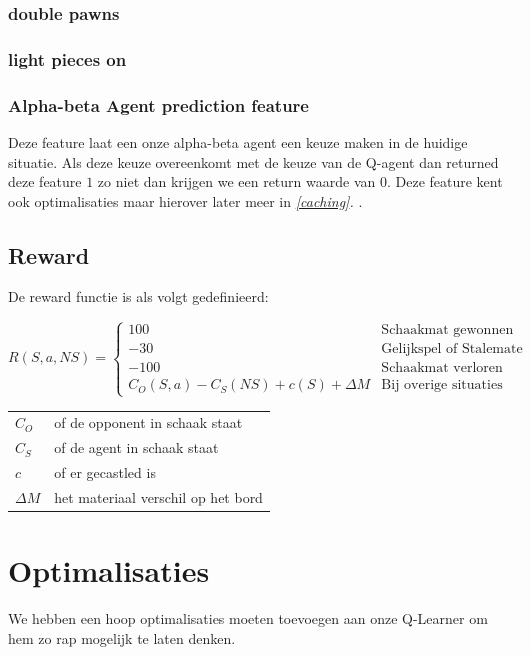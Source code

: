 \documentclass[a4paper,openany]{uantwerpenassignment}
\makeatletter
\newenvironment{conditions}
  {\par\vspace{\abovedisplayskip}\noindent\begin{tabular}{>{$}l<{$} @{${}={}$} l}}
  {\end{tabular}\par\vspace{\belowdisplayskip}}
\newcommand{\reference}[1]{\textit{\ref{#1}. \nameref{#1}}}
\makeatother
\begin{document}
\subsection{double pawns}
\subsection{light pieces on }


\subsection{Alpha-beta Agent prediction feature}

Deze feature laat een onze alpha-beta agent een keuze maken in de huidige situatie. Als deze keuze overeenkomt met de keuze van de Q-agent dan returned deze feature $1$ zo niet dan krijgen we een return waarde van $0$. Deze feature kent ook optimalisaties maar hierover later meer in \reference{caching}.




\section{Reward}

De reward functie is als volgt gedefinieerd:


$$
R(S, a, NS) = 
\begin{cases}
    100 &\mbox{Schaakmat gewonnen}\\
    -30 &\mbox{Gelijkspel of Stalemate}\\
    -100 &\mbox{Schaakmat verloren}\\
     C_O(S, a) - C_S(NS) + c(S) + \Delta M &\mbox{Bij overige situaties}
\end{cases}
$$

\begin{conditions}
    C_O & of de opponent in schaak staat\\
    C_S & of de agent in schaak staat\\
    c &   of er gecastled is\\
    \Delta M & het materiaal verschil op het bord
\end{conditions}


\chapter{Optimalisaties}

We hebben een hoop optimalisaties moeten toevoegen aan onze Q-Learner om hem zo rap mogelijk te laten denken.
\end{document}
